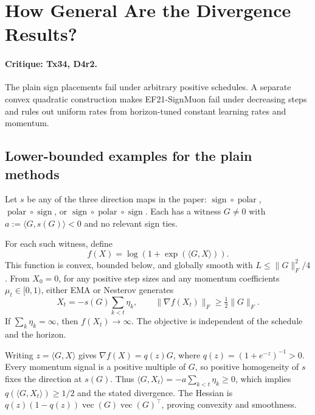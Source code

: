 \section{How General Are the Divergence Results?}
\label{add:divergence}
\paragraph{Critique: Tx34, D4r2.}
The plain sign placements fail under arbitrary positive schedules.
A separate convex quadratic construction makes EF21-SignMuon fail under
decreasing steps and rules out uniform rates from horizon-tuned constant
learning rates and momentum.

\subsection{Lower-bounded examples for the plain methods}
Let $s$ be any of the three direction maps in the paper:
$\operatorname{sign}\circ\operatorname{polar}$,
$\operatorname{polar}\circ\operatorname{sign}$, or
$\operatorname{sign}\circ\operatorname{polar}\circ\operatorname{sign}$.
Each has a witness $G\ne0$ with
$a:=\langle G,s(G)\rangle<0$ and no relevant sign ties.

\begin{proposition}
\label{add:prop:softplus}
For each such witness, define
\[
 f(X)=\log(1+\exp(\langle G,X\rangle)).
\]
This function is convex, bounded below, and globally smooth with
$L\le\|G\|_F^2/4$. From $X_0=0$, for any positive step sizes and any
momentum coefficients $\mu_t\in[0,1)$, either EMA or Nesterov generates
\[
 X_t=-s(G)\sum_{k<t}\eta_k,\qquad
 \|\nabla f(X_t)\|_F\ge\tfrac12\|G\|_F.
\]
If $\sum_k\eta_k=\infty$, then $f(X_t)\to\infty$.
The objective is independent of the schedule and the horizon.
\end{proposition}
\begin{paperproof}
Writing $z=\langle G,X\rangle$ gives
$\nabla f(X)=q(z)G$, where $q(z)=(1+e^{-z})^{-1}>0$.
Every momentum signal is a positive multiple of $G$, so positive
homogeneity of $s$ fixes the direction at $s(G)$.
Thus $\langle G,X_t\rangle=-a\sum_{k<t}\eta_k\ge0$, which implies
$q(\langle G,X_t\rangle)\ge1/2$ and the stated divergence.
The Hessian is $q(z)(1-q(z))\operatorname{vec}(G)
\operatorname{vec}(G)^\top$, proving convexity and smoothness.
\end{paperproof}



